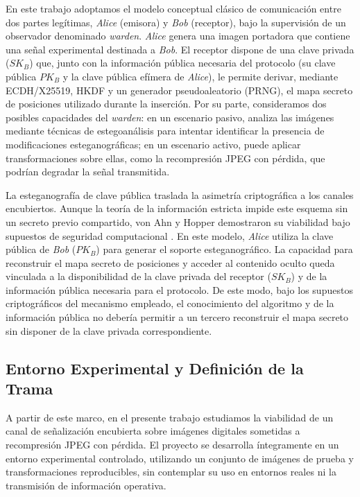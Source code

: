 \documentclass[IB]{TFUOC}%
\begin{document}
En este trabajo adoptamos el modelo conceptual clásico de comunicación entre dos partes legítimas, \textit{Alice} (emisora) y \textit{Bob} (receptor), bajo la supervisión de un observador denominado \textit{warden}. \textit{Alice} genera una imagen portadora que contiene una señal experimental destinada a \textit{Bob}. El receptor dispone de una clave privada ($SK_B$) que, junto con la información pública necesaria del protocolo (su clave pública $PK_B$ y la clave pública efímera de \textit{Alice}), le permite derivar, mediante ECDH/X25519, HKDF y un generador pseudoaleatorio (PRNG), el mapa secreto de posiciones utilizado durante la inserción. Por su parte, consideramos dos posibles capacidades del \textit{warden}: en un escenario pasivo, analiza las imágenes mediante técnicas de estegoanálisis para intentar identificar la presencia de modificaciones esteganográficas; en un escenario activo, puede aplicar transformaciones sobre ellas, como la recompresión JPEG con pérdida, que podrían degradar la señal transmitida.

La esteganografía de clave pública traslada la asimetría criptográfica a los canales encubiertos. Aunque la teoría de la información estricta impide este esquema sin un secreto previo compartido, von Ahn y Hopper demostraron su viabilidad bajo supuestos de seguridad computacional \cite{4}. En este modelo, \textit{Alice} utiliza la clave pública de \textit{Bob} ($PK_B$) para generar el soporte esteganográfico. La capacidad para reconstruir el mapa secreto de posiciones y acceder al contenido oculto queda vinculada a la disponibilidad de la clave privada del receptor ($SK_B$) \cite{4} y de la información pública necesaria para el protocolo. De este modo, bajo los supuestos criptográficos del mecanismo empleado, el conocimiento del algoritmo y de la información pública no debería permitir a un tercero reconstruir el mapa secreto sin disponer de la clave privada correspondiente.

\subsection{Entorno Experimental y Definición de la Trama}
A partir de este marco, en el presente trabajo estudiamos la viabilidad de un canal de señalización encubierta sobre imágenes digitales sometidas a recompresión JPEG con pérdida. El proyecto se desarrolla íntegramente en un entorno experimental controlado, utilizando un conjunto de imágenes de prueba y transformaciones reproducibles, sin contemplar su uso en entornos reales ni la transmisión de información operativa.
\end{document}
